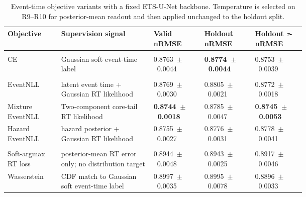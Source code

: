 \documentclass[12pt]{article}
\begin{document}
\begin{table}[!htbp]
\centering
\caption{Event-time objective variants with a fixed ETS-U-Net backbone. Temperature is selected on R9--R10 for posterior-mean readout and then applied unchanged to the holdout split.}
\label{tab:r11_segmentation_losses}
\footnotesize
\setlength{\tabcolsep}{2pt}
\renewcommand{\arraystretch}{1.15}
\begin{tabularx}{\linewidth}{@{} >{\RaggedRight\arraybackslash}p{0.18\linewidth} Y >{\centering\arraybackslash}p{0.17\linewidth} >{\centering\arraybackslash}p{0.17\linewidth} >{\centering\arraybackslash}p{0.17\linewidth} @{}}
\toprule
\textbf{Objective} & \textbf{Supervision signal} & \textbf{Valid nRMSE} & \textbf{Holdout nRMSE} & \textbf{Holdout \(\tau\)-nRMSE} \\
\midrule
{} \\
\addlinespace[0.15em]
CE & Gaussian soft event-time label & \mbox{0.8763 $\pm$ 0.0044} & \textbf{\mbox{0.8774 $\pm$ 0.0044}} & \mbox{0.8753 $\pm$ 0.0039} \\
\midrule
{} \\
\addlinespace[0.15em]
EventNLL & latent event time + Gaussian RT likelihood & \mbox{0.8769 $\pm$ 0.0030} & \mbox{0.8805 $\pm$ 0.0021} & \mbox{0.8772 $\pm$ 0.0018} \\
Mixture EventNLL & Two-component core-tail RT likelihood & \textbf{\mbox{0.8744 $\pm$ 0.0018}} & \mbox{0.8785 $\pm$ 0.0047} & \textbf{\mbox{0.8745 $\pm$ 0.0053}} \\
Hazard EventNLL & hazard posterior + Gaussian RT likelihood & \mbox{0.8755 $\pm$ 0.0027} & \mbox{0.8776 $\pm$ 0.0031} & \mbox{0.8778 $\pm$ 0.0041} \\
\midrule
{} \\
\addlinespace[0.15em]
Soft-argmax RT loss & posterior-mean RT error only; no distribution target & \mbox{0.8944 $\pm$ 0.0048} & \mbox{0.8943 $\pm$ 0.0025} & \mbox{0.8917 $\pm$ 0.0046} \\
Wasserstein & CDF match to Gaussian soft event-time label & \mbox{0.8997 $\pm$ 0.0035} & \mbox{0.8995 $\pm$ 0.0078} & \mbox{0.8896 $\pm$ 0.0033} \\
\bottomrule
\end{tabularx}
\end{table}
\FloatBarrier
\end{document}
